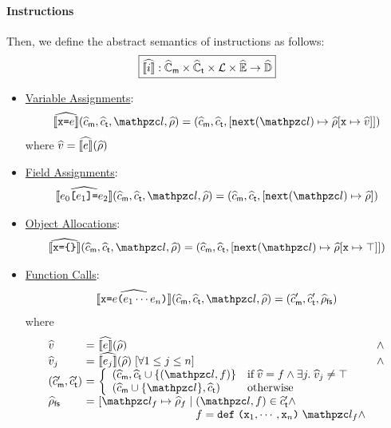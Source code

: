 \paragraph{Instructions} Then, we define the abstract semantics of instructions
as follows:
\[
  \framebox{$\asem{\inst}: \amctxtset \times \atctxtset \times \labset \times
    \aenvset \rightarrow
  \aelemset$}
\]
\begin{itemize}
  \item \underline{Variable Assignments}:
    \[
      \asem{\varx \kweq \expr}(\amctxt, \atctxt, \lab, \aenv) =
      (\amctxt, \atctxt, [\getnext(\lab) \mapsto \aenv[\varx \mapsto \aval]])
    \]
    where $\widehat{v} = \widehat{\llbracket{e}\rrbracket}(\widehat{\rho})$

  \item \underline{Field Assignments}:
    \[
      \asem{\expr_0 \kwsl \expr_1 \kwsr \kweq \expr_2}(\amctxt, \atctxt, \lab, \aenv) =
      (\amctxt, \atctxt, [\getnext(\lab) \mapsto \aenv])
    \]

  \item \underline{Object Allocations}:
    \[
      \asem{\varx \kweq \kwcl \kwcr}(\amctxt, \atctxt, \lab, \aenv) =
      (\amctxt, \atctxt, [\getnext(\lab) \mapsto \aenv[\varx \mapsto \top]])
    \]

  \item \underline{Function Calls}:
    \[
      \asem{\varx \kweq \expr \kwrl \expr_1 \cdots \expr_n \kwrr}(\amctxt,
      \atctxt, \lab, \aenv) = (\amctxt', \atctxt', \afsenv)
    \]
    where
    \[
      \begin{array}{l@{~}c@{~}ll}
        \aval &=& \asem{\expr}(\aenv) &\wedge\\
        \aval_j &=& \asem{\expr_j}(\aenv) \; [\forall 1 \leq j \leq n] &\wedge\\
        (\amctxt', \atctxt') &=& \left\{
          \begin{array}{ll}
            (\amctxt, \atctxt \cup \{ (\lab, \func) \} &
            \text{if} \; \aval = \func \wedge \exists j. \; \aval_j \neq \top\\

            (\amctxt \cup \{ \lab \}, \atctxt) &
            \text{otherwise}
          \end{array}
        \right.\\
        \afsenv &=& [ \lab_\func \mapsto \aenv_\func \mid
        (\lab, \func) \in \atctxt' \wedge\\&&

        \phantom{[\lab_\func \mapsto \aenv_\func \mid \;}
        \func = \kwdef \; \kwrl \varx_1, \cdots, \varx_n \kwrr
        \; \lab_\func \wedge\\&&


\end{array}\]
\end{itemize}
